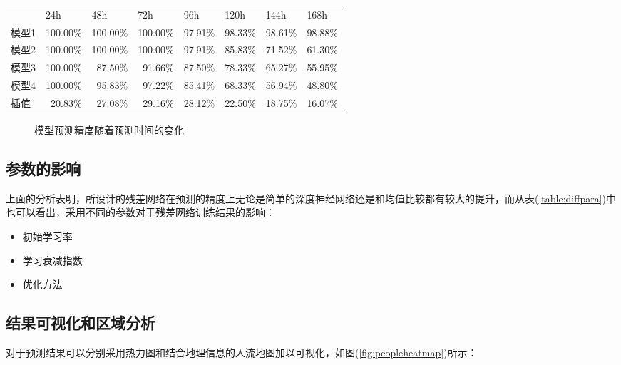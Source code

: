 \begin{table}[htbp]
\begin{tabular}{lrrrrrrr}
          \hline
          & \multicolumn{1}{l}{24h} & \multicolumn{1}{l}{48h} & \multicolumn{1}{l}{72h} & \multicolumn{1}{l}{96h} & \multicolumn{1}{l}{120h} & \multicolumn{1}{l}{144h} & \multicolumn{1}{l}{168h} \\
    模型1   & 100.00\% & 100.00\% & 100.00\% & 97.91\% & 98.33\% & 98.61\% & 98.88\% \\
    模型2   & 100.00\% & 100.00\% & 100.00\% & 97.91\% & 85.83\% & 71.52\% & 61.30\% \\
    模型3   & 100.00\% & 87.50\% & 91.66\% & 87.50\% & 78.33\% & 65.27\% & 55.95\% \\
    模型4   & 100.00\% & 95.83\% & 97.22\% & 85.41\% & 68.33\% & 56.94\% & 48.80\% \\
    插值    & 20.83\% & 27.08\% & 29.16\% & 28.12\% & 22.50\% & 18.75\% & 16.07\% \\
    \hline
    \end{tabular}%
  \label{tab:addlabel}%
\end{table}%

\begin{figure}[ht]
\centering
{}
\hfill
\caption{模型预测精度随着预测时间的变化}
\end{figure}
\subsection*{参数的影响}
上面的分析表明，所设计的残差网络在预测的精度上无论是简单的深度神经网络还是和均值比较都有较大的提升，而从表(\ref{table:diffpara})中也可以看出，采用不同的参数对于残差网络训练结果的影响：
\begin{itemize}
	\item 初始学习率
	\item 学习衰减指数
	\item 优化方法
\end{itemize}
\subsection{结果可视化和区域分析}
对于预测结果可以分别采用热力图和结合地理信息的人流地图加以可视化，如图(\ref{fig:peopleheatmap})所示：

